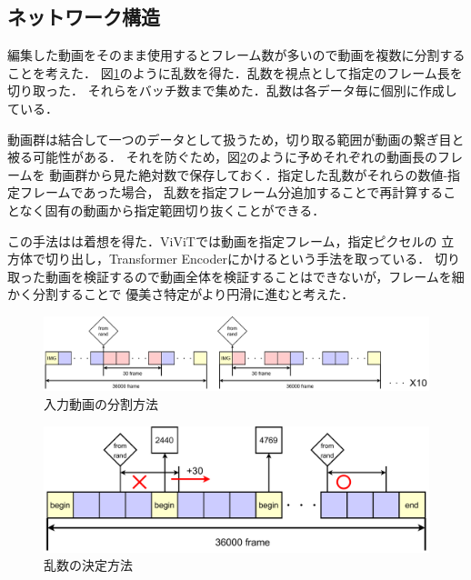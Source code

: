 \subsection{ネットワーク構造}
編集した動画をそのまま使用するとフレーム数が多いので動画を複数に分割することを考えた．
図\ref{range}のように乱数を得た．乱数を視点として指定のフレーム長を切り取った．
それらをバッチ数まで集めた．乱数は各データ毎に個別に作成している．

動画群は結合して一つのデータとして扱うため，切り取る範囲が動画の繋ぎ目と被る可能性がある．
それを防ぐため，図\ref{decide_rand}のように予めそれぞれの動画長のフレームを
動画群から見た絶対数で保存しておく．指定した乱数がそれらの数値-指定フレームであった場合，
乱数を指定フレーム分追加することで再計算することなく固有の動画から指定範囲切り抜くことができる．

この手法は\cite{vivit}は着想を得た．ViViTでは動画を指定フレーム，指定ピクセルの
立方体で切り出し，Transformer Encoderにかけるという手法を取っている．
切り取った動画を検証するので動画全体を検証することはできないが，フレームを細かく分割することで
優美さ特定がより円滑に進むと考えた．

\begin{figure}[b]
  \begin{center}
    \includegraphics[width=120mm]{images/chart/range.pdf}
  \end{center}
  \caption{入力動画の分割方法}
  \label{range}
\end{figure}

\begin{figure}[b]
  \begin{center}
    \includegraphics[width=120mm]{images/chart/decide_rand.pdf}
  \end{center}
  \caption{乱数の決定方法}
  \label{decide_rand}
\end{figure}
\clearpage

